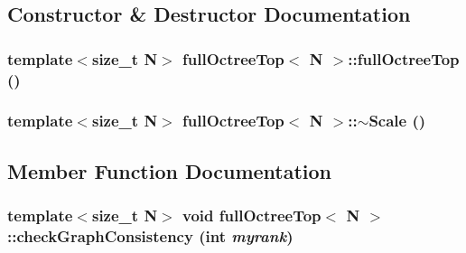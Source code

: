 \subsection{Constructor \& Destructor Documentation}
\hypertarget{classfullOctreeTop_a12f92276ec4139dcd1ca8be5f54f2c7d}{
\subsubsection[{fullOctreeTop}]{\setlength{\rightskip}{0pt plus 5cm}template$<$size\_\-t N$>$ {\bf fullOctreeTop}$<$ N $>$::{\bf fullOctreeTop} ()}}
\label{classfullOctreeTop_a12f92276ec4139dcd1ca8be5f54f2c7d}
\hypertarget{classfullOctreeTop_a3e4c45e27e7a9e571fb27af03075fc70}{
\subsubsection[{$\sim$Scale}]{\setlength{\rightskip}{0pt plus 5cm}template$<$size\_\-t N$>$ {\bf fullOctreeTop}$<$ N $>$::$\sim$Scale ()}}
\label{classfullOctreeTop_a3e4c45e27e7a9e571fb27af03075fc70}


\subsection{Member Function Documentation}
\hypertarget{classfullOctreeTop_a1e5fd8556f13e91699381f589eb1e372}{
\subsubsection[{checkGraphConsistency}]{\setlength{\rightskip}{0pt plus 5cm}template$<$size\_\-t N$>$ void {\bf fullOctreeTop}$<$ N $>$::checkGraphConsistency (int {\em myrank})}}
\label{classfullOctreeTop_a1e5fd8556f13e91699381f589eb1e372}

